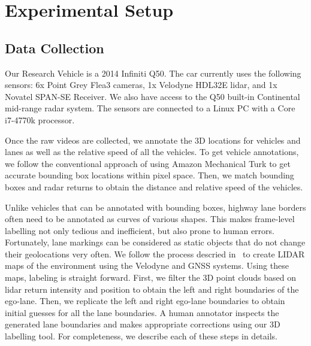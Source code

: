 \documentclass[journal]{IEEEtran}
\begin{document}
\section{Experimental Setup}

\subsection{Data Collection}
Our Research Vehicle is a 2014 Infiniti Q50. The car currently uses the following sensors: 6x Point Grey Flea3 cameras, 1x Velodyne HDL32E lidar, and 1x Novatel SPAN-SE Receiver. We also have access to the Q50 built-in Continental mid-range radar system. The sensors are connected to a Linux PC with a Core i7-4770k processor.

Once the raw videos are collected, we annotate the 3D locations for vehicles and lanes as well as the relative speed of all the vehicles. To get vehicle annotations, we follow the conventional approach of using Amazon Mechanical Turk to get accurate bounding box locations within pixel space. Then, we match bounding boxes and radar returns to obtain the distance and relative speed of the vehicles.

Unlike vehicles that can be annotated with bounding boxes, highway lane borders often need to be annotated as curves of various shapes. This makes frame-level labelling not only tedious and inefficient, but also prone to human errors. Fortunately, lane markings can be considered as static objects that do not change their geolocations very often. We follow the process descried in~\cite{levinson-2011} to create LIDAR maps of the environment using the Velodyne and GNSS systems. Using these maps, labeling is straight forward. First, we filter the 3D point clouds based on lidar return intensity and position to obtain the left and right boundaries of the ego-lane. Then, we replicate the left and right ego-lane boundaries to obtain initial guesses for all the lane boundaries. A human annotator inspects the generated lane boundaries and makes appropriate corrections using our 3D labelling tool. For completeness, we describe each of these steps in details.
\end{document}
